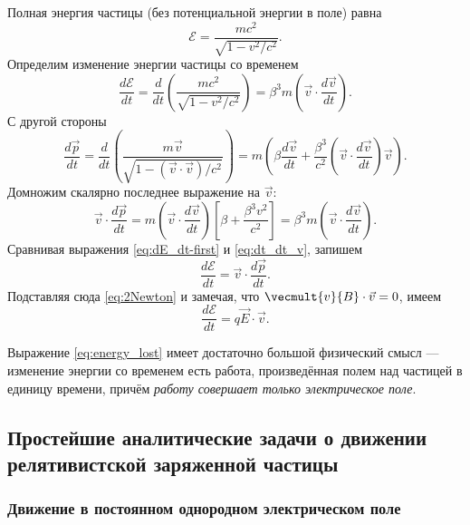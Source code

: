 Полная энергия частицы (без потенциальной энергии в поле) равна~\cite{Landau2} 
\begin{equation}
\mathscr{E} =\frac{ mc^2}{\sqrt{1 - v^2/c^2}}.
\label{eq:full_energy}
\end{equation}
Определим изменение энергии частицы со временем
\begin{equation}
\frac{d \mathscr{E}}{dt} = \frac{d}{dt} \left( \frac{mc^2}{\sqrt{ 1 - v^2/c^2}} \right) = \beta^3 m \left(\vec{v} \cdot \frac{d\vec{v}}{dt}\right).
\label{eq:dE_dt-first}
\end{equation}
С другой стороны
\begin{equation}
\frac{d\vec{p}}{dt} = \frac{d}{dt} \left(  \frac{m \vec{v}}{\sqrt{1 - (\vec{v} \cdot \vec{v})/c^2}}  \right) = m \left( \beta \frac{d \vec{v}}{dt} + \frac{\beta^3}{c^2} \left(\vec{v} \cdot \frac{d \vec{v}}{dt}  \right) \vec{v} \right).
\label{eq:full_ddddt}
\end{equation}
Домножим скалярно последнее выражение на $\vec{v}$:
\begin{equation}
\vec{v} \cdot \frac{d \vec{p}}{dt} = m \left(\vec{v} \cdot \frac{d \vec{v}}{dt}\right) \left[\beta + \frac{\beta^3 v^2}{c^2}\right] = \beta^3 m \left(\vec{v} \cdot \frac{d\vec{v}}{dt}\right).
\label{eq:dt_dt_v}
\end{equation}
Сравнивая выражения \eqref{eq:dE_dt-first} и \eqref{eq:dt_dt_v}, запишем
\begin{equation}
\frac{d \mathscr{E}}{dt} = \vec{v} \cdot \frac{d\vec{p}}{dt}.
\end{equation}
Подставляя сюда \eqref{eq:2Newton} и замечая, что $\vecmult{v}{B} \cdot \vec{v} = 0$, имеем
\begin{equation}
\frac{d \mathscr{E}}{dt} = q \vec{E} \cdot \vec{v}.
\label{eq:energy_lost}
\end{equation}

Выражение \eqref{eq:energy_lost} имеет достаточно большой физический смысл --- изменение энергии со временем есть работа, произведённая полем над частицей в единицу времени, причём \textit{работу совершает только электрическое поле}.

\subsection{Простейшие аналитические задачи о движении релятивистской заряженной частицы}

\subsubsection{Движение в постоянном однородном электрическом поле}

